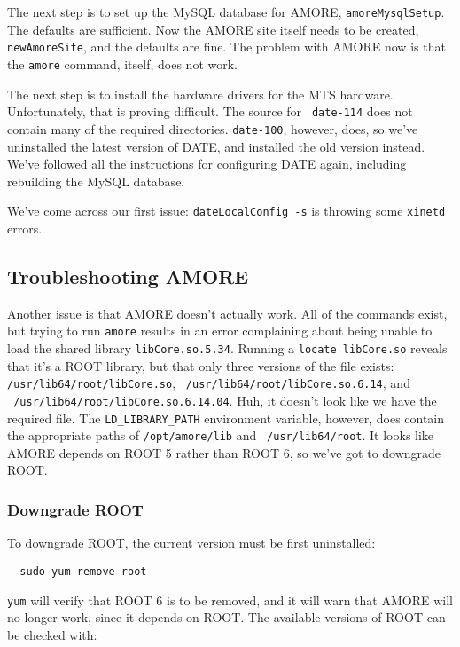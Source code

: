 \documentclass[12pt]{article}
\begin{document}
\qq The next step is to set up the MySQL database for AMORE, {\tt amoreMysqlSetup}.
The defaults are sufficient. Now the AMORE site itself needs to be created, {\tt
  newAmoreSite}, and the defaults are fine. The problem with AMORE now is that
the {\tt amore} command, itself, does not work.

\qq The next step is to install the hardware drivers for the MTS
hardware. Unfortunately, that is proving difficult. The source for {\tt
  date-114} does not contain many of the required directories. {\tt date-100},
however, does, so we've uninstalled the latest version of DATE, and installed
the old version instead. We've followed all the instructions for configuring
DATE again, including rebuilding the MySQL database.

\qq We've come across our first issue: {\tt dateLocalConfig -s} is throwing some
{\tt xinetd} errors.

\subsection{Troubleshooting AMORE}

\qq Another issue is that AMORE doesn't actually work. All of the commands
exist, but trying to run {\tt amore} results in an error complaining about being
unable to load the shared library {\tt libCore.so.5.34}. Running a {\tt locate
  libCore.so} reveals that it's a ROOT library, but that only three versions of
the file exists: {\tt /usr/lib64/root/libCore.so}, {\tt
  /usr/lib64/root/libCore.so.6.14}, and \\ {\tt
  /usr/lib64/root/libCore.so.6.14.04}. Huh, it doesn't look like we have the
required file. The {\tt LD\_LIBRARY\_PATH} environment variable, however, does
contain the appropriate paths of {\tt /opt/amore/lib} and {\tt
  /usr/lib64/root}. It looks like AMORE depends on ROOT 5 rather than ROOT 6, so
we've got to downgrade ROOT.

\subsubsection{Downgrade ROOT}

\qq To downgrade ROOT, the current version must be first uninstalled: 

\begin{verbatim}
  sudo yum remove root
\end{verbatim}

 {\tt yum} will verify that ROOT 6 is to be removed, and it
will warn that AMORE will no longer work, since it depends on ROOT. The
available versions of ROOT can be checked with: 
\end{document}
